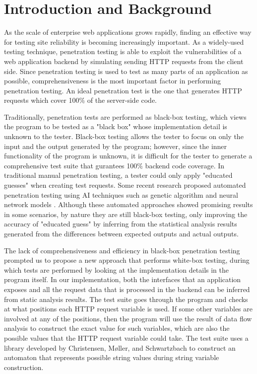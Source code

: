\chapter{Introduction and Background}

As the scale of enterprise web applications grows rapidly, finding an effective way for testing site reliability is becoming increasingly important. As a widely-used testing technique, penetration testing is able to exploit the vulnerabilities of a web application backend by simulating sending HTTP requests from the client side. Since penetration testing is used to test as many parts of an application as possible, comprehensiveness is the most important factor in performing penetration testing. An ideal penetration test is the one that generates HTTP requests which cover 100\% of the server-side code.

Traditionally, penetration tests are performed as black-box testing, which views the program to be tested as a "black box" whose implementation detail is unknown to the tester. Black-box testing allows the tester to focus on only the input and the output generated by the program; however, since the inner functionality of the program is unknown, it is difficult for the tester to generate a comprehensive test suite that gurantees 100\% backend code coverage. In traditional manual penetration testing, a tester could only apply "educated guesses" when creating test requests. Some recent research proposed automated penetration testing using AI techniques such as genetic algorithm \cite{ref1} and neural network models \cite{ref2}. Although these automated approaches showed promising results in some scenarios, by nature they are still black-box testing, only improving the accuracy of "educated guess" by inferring from the statistical analysis results generated from the differences between expected outputs and actual outputs.

The lack of comprehensiveness and efficiency in black-box penetration testing prompted us to propose a new approach that performs white-box testing, during which tests are performed by looking at the implementation details in the program itself. In our implementation, both the interfaces that an application exposes and all the request data that is processed in the backend can be inferred from static analysis results. The test suite goes through the program and checks at what positions each HTTP request variable is used. If some other variables are involved at any of the positions, then the program will use the result of data flow analysis to construct the exact value for such variables, which are also the possible values that the HTTP request variable could take. The test suite uses a library developed by Christensen, Møller, and Schwartzbach \cite{ref4} to construct an automaton that represents possible string values during string variable construction.


